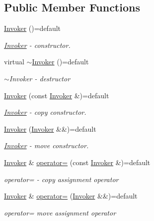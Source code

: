 \subsection*{Public Member Functions}
\begin{DoxyCompactItemize}
\item 
\hyperlink{a00009_a6e5e462211d17404ba6d656bec647d7c_a6e5e462211d17404ba6d656bec647d7c}{Invoker} ()=default
\begin{DoxyCompactList}\small\item\em \hyperlink{a00009}{Invoker} -\/ constructor. \end{DoxyCompactList}\item 
virtual \hyperlink{a00009_a76fd06a765d40c6179dfa0cab5cbd978_a76fd06a765d40c6179dfa0cab5cbd978}{$\sim$\+Invoker} ()=default
\begin{DoxyCompactList}\small\item\em $\sim$\+Invoker -\/ destructor \end{DoxyCompactList}\item 
\hyperlink{a00009_a2055f499946cba7327b5c3632061d1ce_a2055f499946cba7327b5c3632061d1ce}{Invoker} (const \hyperlink{a00009}{Invoker} \&)=default
\begin{DoxyCompactList}\small\item\em \hyperlink{a00009}{Invoker} -\/ copy constructor. \end{DoxyCompactList}\item 
\hyperlink{a00009_a4e3d12bafbf74728a2aee31361be4fb0_a4e3d12bafbf74728a2aee31361be4fb0}{Invoker} (\hyperlink{a00009}{Invoker} \&\&)=default
\begin{DoxyCompactList}\small\item\em \hyperlink{a00009}{Invoker} -\/ move constructor. \end{DoxyCompactList}\item 
\hyperlink{a00009}{Invoker} \& \hyperlink{a00009_ac94844d9754016a60334572f4a288aa7_ac94844d9754016a60334572f4a288aa7}{operator=} (const \hyperlink{a00009}{Invoker} \&)=default
\begin{DoxyCompactList}\small\item\em operator= -\/ copy assignment operator \end{DoxyCompactList}\item 
\hyperlink{a00009}{Invoker} \& \hyperlink{a00009_ad6797b918ce58ab2c26e686bb15523c8_ad6797b918ce58ab2c26e686bb15523c8}{operator=} (\hyperlink{a00009}{Invoker} \&\&)=default
\begin{DoxyCompactList}\small\item\em operator= move assignment operator \end{DoxyCompactList}\item 

\end{DoxyCompactItemize}
